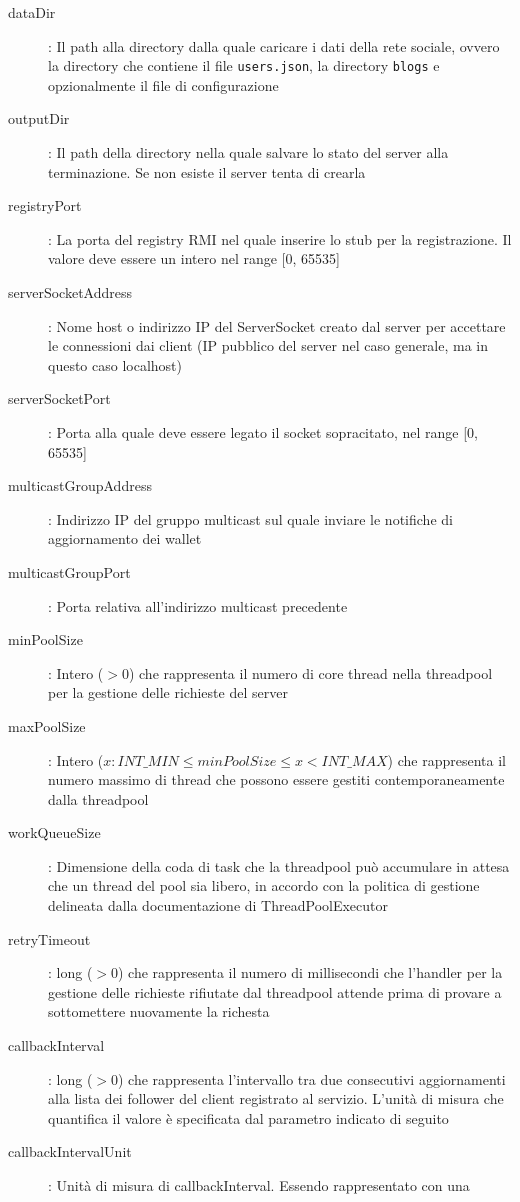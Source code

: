 \begin{description}
	\item[dataDir]: Il path alla directory dalla quale caricare i dati della rete sociale, ovvero la directory che contiene il file \verb|users.json|, la directory \verb|blogs| e opzionalmente il file di configurazione
	\item[outputDir]: Il path della directory nella quale salvare lo stato del server alla terminazione. Se non esiste il server tenta di crearla
	\item[registryPort]: La porta del registry RMI nel quale inserire lo stub per la registrazione. Il valore deve essere un intero nel range [0, 65535]
	\item[serverSocketAddress]: Nome host o indirizzo IP del ServerSocket creato dal server per accettare le connessioni dai client (IP pubblico del server nel caso generale, ma in questo caso localhost)
	\item[serverSocketPort]: Porta alla quale deve essere legato il socket sopracitato, nel range [0, 65535]
	\item[multicastGroupAddress]: Indirizzo IP del gruppo multicast sul quale inviare le notifiche di aggiornamento dei wallet
	\item[multicastGroupPort]: Porta relativa all'indirizzo multicast precedente
	\item[minPoolSize]: Intero ($>0$) che rappresenta il numero di core thread nella threadpool per la gestione delle richieste del server
	\item[maxPoolSize]: Intero ($x : INT\_MIN \le minPoolSize \le x < INT\_MAX$) che rappresenta il numero massimo di thread che possono essere gestiti contemporaneamente dalla threadpool
	\item[workQueueSize]: Dimensione della coda di task che la threadpool può accumulare in attesa che un thread del pool sia libero, in accordo con la politica di gestione delineata dalla documentazione di ThreadPoolExecutor
	\item[retryTimeout]: long ($>0$) che rappresenta il numero di millisecondi che l'handler per la gestione delle richieste rifiutate dal threadpool attende prima di provare a sottomettere nuovamente la richesta
	\item[callbackInterval]: long ($>0$) che rappresenta l'intervallo tra due consecutivi aggiornamenti alla lista dei follower del client registrato al servizio. L'unità di misura che quantifica il valore è specificata dal parametro indicato di seguito
	\item[callbackIntervalUnit]: Unità di misura di callbackInterval. Essendo rappresentato con una\\

\end{description}
